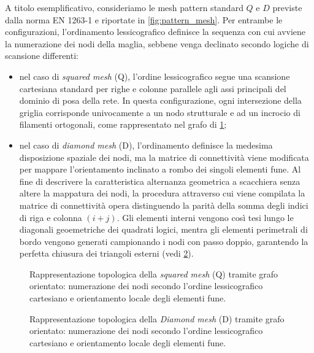 A titolo esemplificativo, consideriamo le mesh pattern standard $Q$ e $D$ previste dalla norma EN 1263-1 \cite{EN1263-1} e riportate in \cref{fig:pattern_mesh}. Per entrambe le configurazioni, l'ordinamento lessicografico definisce la sequenza con cui avviene la numerazione dei nodi della maglia, sebbene venga declinato secondo logiche di scansione differenti: 
\begin{itemize}
   \item nel caso di \textit{squared mesh} (Q), l'ordine lessicografico segue una scansione cartesiana standard per righe e colonne parallele agli assi principali del dominio di posa della rete. In questa configurazione, ogni intersezione della griglia corrisponde univocamente a un nodo strutturale e ad un incrocio di filamenti ortogonali, come rappresentato nel grafo di \cref{fig:grafo_squared};
   \item nel caso di \textit{diamond mesh} (D), l'ordinamento definisce la medesima disposizione spaziale dei nodi, ma la matrice di connettività viene modificata per mappare l'orientamento inclinato a rombo dei singoli elementi fune. Al fine di descrivere la caratteristica alternanza geometrica a scacchiera senza altere la mappatura dei nodi, la procedura attraverso cui viene compilata la matrice di connettività opera distinguendo la parità della somma degli indici di riga e colonna $(i + j)$. Gli elementi interni vengono così tesi lungo le diagonali geoemetriche dei quadrati logici, mentra gli elementi perimetrali di bordo vengono generati campionando i nodi con passo doppio, garantendo la perfetta chiusura dei triangoli esterni (vedi \cref{fig:grafo_diamond}).
\end{itemize}

\begin{figure}[htbp]
    \centering
    
    \caption{Rappresentazione topologica della \textit{squared mesh} (Q) tramite grafo orientato: numerazione dei nodi secondo l'ordine lessicografico cartesiano e orientamento locale degli elementi fune.}
    \label{fig:grafo_squared}
\end{figure}

\begin{figure}[htbp]
    \centering
    
    \caption{Rappresentazione topologica della \textit{Diamond mesh} (D) tramite grafo orientato: numerazione dei nodi secondo l'ordine lessicografico cartesiano e orientamento locale degli elementi fune.}
    \label{fig:grafo_diamond}
\end{figure}

